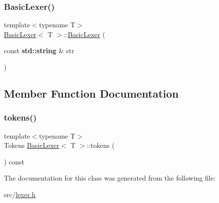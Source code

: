 \mbox{\label{class_basic_lexer_ab486a96453887dc7f9efd08c518ae0b0}} 
\subsubsection{\texorpdfstring{Basic\+Lexer()}{BasicLexer()}\hspace{0.1cm}{\footnotesize\ttfamily [6/6]}}
{\footnotesize\ttfamily template$<$typename T$>$ \\
\hyperlink{class_basic_lexer}{Basic\+Lexer}$<$ T $>$\+::\hyperlink{class_basic_lexer}{Basic\+Lexer} (\begin{DoxyParamCaption}\item[{const \textbf{ std\+::string} \&}]{str }\end{DoxyParamCaption})\hspace{0.3cm}{\ttfamily [inline]}}



\subsection{Member Function Documentation}
\mbox{\label{class_basic_lexer_ac20fdf19d5602c563b5cad2bae3ad803}} 
\subsubsection{\texorpdfstring{tokens()}{tokens()}}
{\footnotesize\ttfamily template$<$typename T$>$ \\
Tokens \hyperlink{class_basic_lexer}{Basic\+Lexer}$<$ T $>$\+::tokens (\begin{DoxyParamCaption}{ }\end{DoxyParamCaption}) const\hspace{0.3cm}{\ttfamily [inline]}}



The documentation for this class was generated from the following file\+:\begin{DoxyCompactItemize}
\item 
src/\hyperlink{lexer_8h}{lexer.\+h}\end{DoxyCompactItemize}
